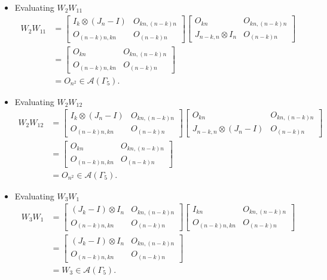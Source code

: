 \begin{itemize}
\item Evaluating $W_{2}W_{11}$
\begin{align*}
W_2W_{11} &=
\begin{bmatrix}
I_k \otimes (J_n - I) & O_{kn, (n-k)n} \\
O_{(n-k)n,kn} & O_{(n-k)n}
\end{bmatrix}
\begin{bmatrix}
O_{kn} & O_{kn,(n-k)n} \\
J_{n-k,n}\otimes I_n & O_{(n-k)n}
\end{bmatrix}\\
&= \begin{bmatrix}
O_{kn} & O_{kn,(n-k)n} \\
O_{(n-k)n,kn} & O_{(n-k)n}
\end{bmatrix}\\
&= O_{n^2}\in\mathcal{A}(\Gamma_5).
\end{align*}

\item Evaluating $W_{2}W_{12}$
\begin{align*}
W_2W_{12} &=
\begin{bmatrix}
I_k \otimes (J_n - I) & O_{kn, (n-k)n} \\
O_{(n-k)n,kn} & O_{(n-k)n}
\end{bmatrix}
\begin{bmatrix}
O_{kn} & O_{kn,(n-k)n} \\
J_{n-k,n}\otimes (J_n-I) & O_{(n-k)n}
\end{bmatrix}\\
&= \begin{bmatrix}
O_{kn} & O_{kn,(n-k)n} \\
O_{(n-k)n,kn} & O_{(n-k)n}
\end{bmatrix}\\
&= O_{n^2}\in\mathcal{A}(\Gamma_5).
\end{align*}

\item Evaluating $W_{3}W_{1}$
\begin{align*}
W_3W_1 &=
\begin{bmatrix}
(J_k - I) \otimes I_n & O_{kn, (n-k)n} \\
O_{(n-k)n,kn} & O_{(n-k)n}
\end{bmatrix}
\begin{bmatrix}
I_{kn} & O_{kn, (n-k)n} \\
O_{(n-k)n,kn} & O_{(n-k)n}
\end{bmatrix}\\
&= \begin{bmatrix}
(J_k - I) \otimes I_n & O_{kn, (n-k)n} \\
O_{(n-k)n,kn} & O_{(n-k)n}
\end{bmatrix}\\
&= W_3\in\mathcal{A}(\Gamma_5).
\end{align*}


\end{itemize}
